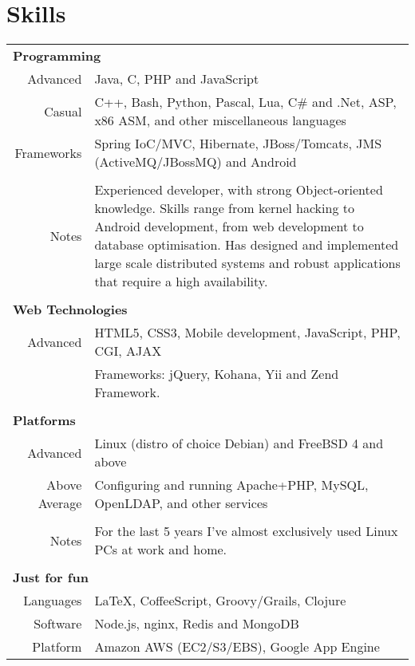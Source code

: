 \documentclass[letterpaper,10pt]{article}
\begin{document}
\section{Skills}
\begin{tabularx}{\textwidth}{r|X}

\multicolumn{2}{l}{\textbf{Programming}} \\
Advanced      & Java, C, PHP and JavaScript \\
Casual        & C++, Bash, Python, Pascal, Lua, C\# and .Net, ASP, x86 ASM, and other miscellaneous languages \\
Frameworks    & Spring IoC/MVC, Hibernate, JBoss/Tomcats, JMS (ActiveMQ/JBossMQ) and Android \\
\\
Notes         & Experienced developer, with strong Object-oriented knowledge. Skills range from kernel hacking to Android
                development, from web development to database optimisation. Has designed and implemented large scale distributed
                systems and robust applications that require a high availability.\\


\multicolumn{2}{l}{} \\
\multicolumn{2}{l}{\textbf{Web Technologies}} \\
Advanced & HTML5, CSS3, Mobile development, JavaScript, PHP, CGI, AJAX \\
         & Frameworks: jQuery, Kohana, Yii and Zend Framework.\\


\multicolumn{2}{l}{} \\
\multicolumn{2}{l}{\textbf{Platforms}} \\
Advanced       & Linux (distro of choice Debian) and FreeBSD 4 and above\\
Above Average  & Configuring and running Apache+PHP, MySQL, OpenLDAP, and other services\\
\\
Notes          & For the last 5 years I've almost exclusively used Linux PCs at work and home.\\


\multicolumn{2}{l}{} \\
\multicolumn{2}{l}{\textbf{Just for fun}} \\
Languages      & \LaTeX, CoffeeScript, Groovy/Grails, Clojure \\
Software       & Node.js, nginx, Redis and MongoDB \\
Platform       & Amazon AWS (EC2/S3/EBS), Google App Engine



\end{tabularx}
\end{document}
